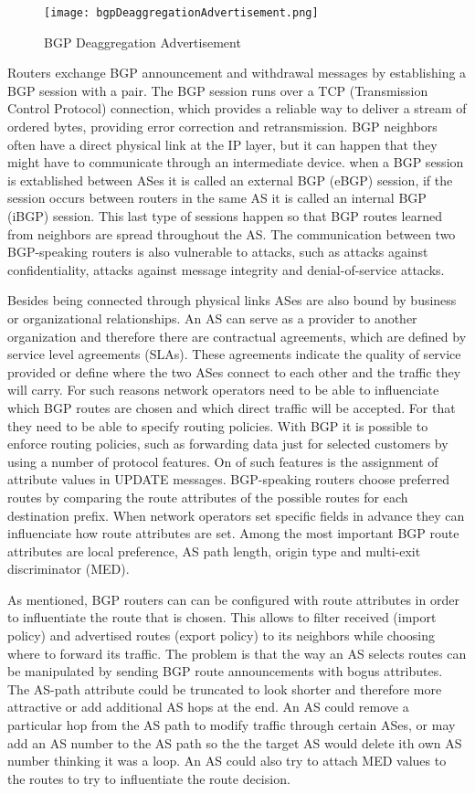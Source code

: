 \documentclass[11pt,a4paper]{scrreprt}
\begin{document}
\begin{figure}[!h]
\centering
\texttt{[image: bgpDeaggregationAdvertisement.png]}
\caption{BGP Deaggregation Advertisement}
\label{fig:bgpDeaggregationAdvertisement}
\end{figure}


Routers exchange BGP announcement and withdrawal messages by establishing a BGP session with a pair. The BGP session runs over a TCP (Transmission Control Protocol) connection, which provides a reliable way to deliver a stream of ordered bytes, providing error correction and retransmission. BGP neighbors often have a direct physical link at the IP layer, but it can happen that they might have to communicate through an intermediate device. when a BGP session is extablished between ASes it is called an external BGP (eBGP) session, if the session occurs between routers in the same AS it is called an internal BGP (iBGP) session. This last type of sessions happen so that BGP routes learned from neighbors are spread throughout the AS. The communication between two BGP-speaking routers is also vulnerable to attacks, such as attacks against confidentiality, attacks against message integrity and denial-of-service attacks.

Besides being connected through physical links ASes are also bound by business or organizational relationships. An AS can serve as a provider to another organization and therefore there are contractual agreements, which are defined by service level agreements (SLAs). These agreements indicate the quality of service provided or define where the two ASes connect to each other and the traffic they will carry. For such reasons network operators need to be able to influenciate which BGP routes are chosen and which direct traffic will be accepted. For that they need to be able to specify routing policies. With BGP it is possible to enforce routing policies, such as forwarding data just for selected customers by using a number of protocol features. On of such features is the assignment of attribute values in UPDATE messages. BGP-speaking routers choose preferred routes by comparing the route attributes of the possible routes for each destination prefix. When network operators set specific fields in advance they can influenciate how route attributes are set. Among the most important BGP route attributes are local preference, AS path length, origin type and multi-exit discriminator (MED).

As mentioned, BGP routers can can be configured with route attributes in order to influentiate the route that is chosen. This allows to filter received (import policy) and advertised routes (export policy) to its neighbors while choosing where to forward its traffic. The problem is that the way an AS selects routes can be manipulated by sending BGP route announcements with bogus attributes. The AS-path attribute could be truncated to look shorter and therefore more attractive or add additional AS hops at the end. An AS could remove a particular hop from the AS path to modify traffic through certain ASes, or may add an AS number to the AS path so the the target AS would delete ith own AS number thinking it was a loop. An AS could also try to attach MED values to the routes to try to influentiate the route decision. 
\end{document}
